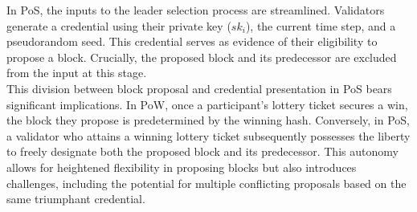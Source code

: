 In PoS, the inputs to the leader selection process are streamlined. Validators generate a credential using their private key ($sk_i$), the current time step, and a pseudorandom seed. This credential serves as evidence of their eligibility to propose a block. Crucially, the proposed block and its predecessor are excluded from the input at this stage.\\
This division between block proposal and credential presentation in PoS bears significant implications. In PoW, once a participant's lottery ticket secures a win, the block they propose is predetermined by the winning hash. Conversely, in PoS, a validator who attains a winning lottery ticket subsequently possesses the liberty to freely designate both the proposed block and its predecessor. This autonomy allows for heightened flexibility in proposing blocks but also introduces challenges, including the potential for multiple conflicting proposals based on the same triumphant credential.


